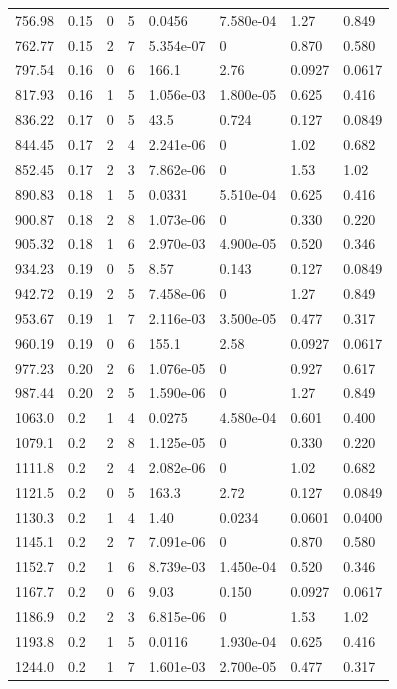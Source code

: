 \documentclass[preview]{standalone}
\begin{document}
{{{\begin{tabular}{L{1.2cm}C{1.2cm} C{0.3cm}C{0.5cm} C{1.4cm}C{1.4cm} C{1.4cm}C{1.4cm}}
  756.98  &  0.15  & 0     &  5 &  0.0456  & 7.580e-04  & 1.27 &  0.849   \\ 
  762.77  &  0.15  & 2     &  7 &  5.354e-07  & 0  & 0.870 &  0.580   \\ 
  797.54  &  0.16  & 0     &  6 &  166.1  & 2.76  & 0.0927 &  0.0617   \\ 
  817.93  &  0.16  & 1     &  5 &  1.056e-03  & 1.800e-05  & 0.625 &  0.416   \\ 
  836.22  &  0.17  & 0     &  5 &  43.5  & 0.724  & 0.127 &  0.0849   \\ 
  844.45  &  0.17  & 2     &  4 &  2.241e-06  & 0  & 1.02 &  0.682   \\ 
  852.45  &  0.17  & 2     &  3 &  7.862e-06  & 0  & 1.53 &  1.02   \\ 
  890.83  &  0.18  & 1     &  5 &  0.0331  & 5.510e-04  & 0.625 &  0.416   \\ 
  900.87  &  0.18  & 2     &  8 &  1.073e-06  & 0  & 0.330 &  0.220   \\ 
  905.32  &  0.18  & 1     &  6 &  2.970e-03  & 4.900e-05  & 0.520 &  0.346   \\ 
  934.23  &  0.19  & 0     &  5 &  8.57  & 0.143  & 0.127 &  0.0849   \\ 
  942.72  &  0.19  & 2     &  5 &  7.458e-06  & 0  & 1.27 &  0.849   \\ 
  953.67  &  0.19  & 1     &  7 &  2.116e-03  & 3.500e-05  & 0.477 &  0.317   \\ 
  960.19  &  0.19  & 0     &  6 &  155.1  & 2.58  & 0.0927 &  0.0617   \\ 
  977.23  &  0.20  & 2     &  6 &  1.076e-05  & 0  & 0.927 &  0.617   \\ 
  987.44  &  0.20  & 2     &  5 &  1.590e-06  & 0  & 1.27 &  0.849   \\ 
  1063.0  &   0.2  & 1     &  4 &  0.0275  & 4.580e-04  & 0.601 &  0.400   \\ 
  1079.1  &   0.2  & 2     &  8 &  1.125e-05  & 0  & 0.330 &  0.220   \\ 
  1111.8  &   0.2  & 2     &  4 &  2.082e-06  & 0  & 1.02 &  0.682   \\ 
  1121.5  &   0.2  & 0     &  5 &  163.3  & 2.72  & 0.127 &  0.0849   \\ 
  1130.3  &   0.2  & 1     &  4 &  1.40  & 0.0234  & 0.0601 &  0.0400   \\ 
  1145.1  &   0.2  & 2     &  7 &  7.091e-06  & 0  & 0.870 &  0.580   \\ 
  1152.7  &   0.2  & 1     &  6 &  8.739e-03  & 1.450e-04  & 0.520 &  0.346   \\ 
  1167.7  &   0.2  & 0     &  6 &  9.03  & 0.150  & 0.0927 &  0.0617   \\ 
  1186.9  &   0.2  & 2     &  3 &  6.815e-06  & 0  & 1.53 &  1.02   \\ 
  1193.8  &   0.2  & 1     &  5 &  0.0116  & 1.930e-04  & 0.625 &  0.416   \\ 
  1244.0  &   0.2  & 1     &  7 &  1.601e-03  & 2.700e-05  & 0.477 &  0.317   \\ 
\hline 
\end{tabular} 

}}}
\end{document}
